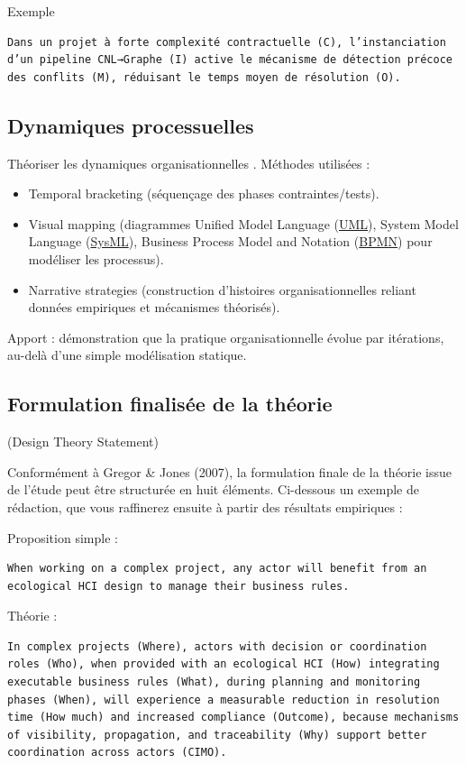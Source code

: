 \documentclass[a4paper,12pt]{article}
\begin{document}
Exemple
\begin{verbatim}
Dans un projet à forte complexité contractuelle (C), l’instanciation d’un pipeline CNL→Graphe (I) active le mécanisme de détection précoce des conflits (M), réduisant le temps moyen de résolution (O).
\end{verbatim}
\subsection{Dynamiques processuelles}
\label{sec:org6018c8b}
Théoriser les dynamiques organisationnelles \autocite[(1999)]{Langley}.
Méthodes utilisées :
\begin{itemize}
\item Temporal bracketing (séquençage des phases contraintes/tests).
\item Visual mapping (diagrammes Unified Model Language
 (\protect\hyperlink{gls-18}{\label{gls-18-use-1}UML}), System Model Language
 (\protect\hyperlink{gls-19}{\label{gls-19-use-1}SysML}), Business Process Model and Notation
 (\protect\hyperlink{gls-20}{\label{gls-20-use-1}BPMN}) pour modéliser les processus).
\item Narrative strategies (construction d’histoires organisationnelles reliant données empiriques et mécanismes théorisés).
\end{itemize}

Apport : démonstration que la pratique organisationnelle évolue par itérations, au-delà d’une simple modélisation statique.
\subsection{Formulation finalisée de la théorie}
\label{sec:orgc08a18c}
(Design Theory Statement)

Conformément à Gregor \& Jones (2007), la formulation finale de la théorie issue de l’étude peut être structurée en huit éléments. Ci-dessous un exemple de rédaction, que vous raffinerez ensuite à partir des résultats empiriques :

Proposition simple :
\begin{verbatim}
When working on a complex project, any actor will benefit from an ecological HCI design to manage their business rules.
\end{verbatim}

Théorie :
\begin{verbatim}
In complex projects (Where), actors with decision or coordination roles (Who), when provided with an ecological HCI (How) integrating executable business rules (What), during planning and monitoring phases (When), will experience a measurable reduction in resolution time (How much) and increased compliance (Outcome), because mechanisms of visibility, propagation, and traceability (Why) support better coordination across actors (CIMO).
\end{verbatim}
\end{document}
